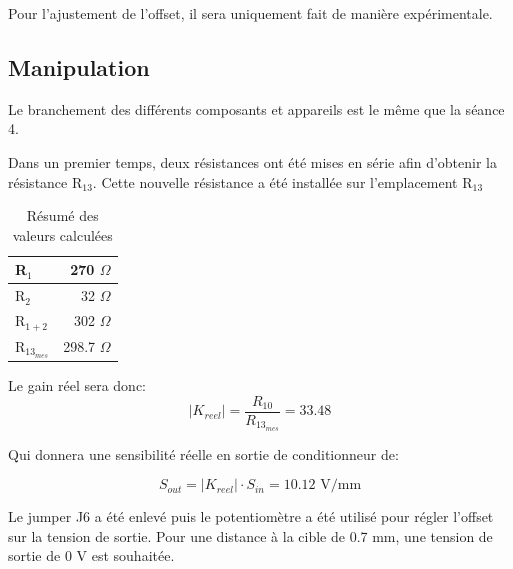 Pour l'ajustement de l'offset, il sera uniquement fait de manière expérimentale.

\subsection{Manipulation}
Le branchement des différents composants et appareils est le même que la séance 4.

\vspace{0.2cm}

Dans un premier temps, deux résistances ont été mises en série afin d'obtenir la résistance
R$_{13}$. Cette nouvelle résistance a été installée sur l'emplacement R$_{13}$

\begin{table}[H]
    \centering
    \begin{tabular}{|l|r|}
    \cline{1-2}
    R$_{1}$   & 270 $\Omega$   \\ \hline
    R$_{2}$   & 32  $\Omega$        \\ \hline
    R$_{1+2}$ & 302 $\Omega$ \\ \hline
    R$_{13_{mes}}$ & 298.7 $\Omega$ \\ \hline
    \end{tabular}
    \caption{Résumé des valeurs calculées}
    \label{tab:ResumeValeurs}
\end{table}

Le gain réel sera donc:
\begin{equation*}
    |K_{reel}| = \frac{R_{10}}{R_{13_{mes}}} = 33.48   
\end{equation*}

Qui donnera une sensibilité réelle en sortie de conditionneur de:

\begin{equation*}
    S_{out} = |K_{reel}|\cdot S_{in} =10.12 \text{ V/mm} 
\end{equation*}
\vspace{0.2cm}

Le jumper J6 a été enlevé puis le potentiomètre a été utilisé pour régler l'offset sur la tension 
de sortie. Pour une distance à la cible de 0.7 mm, une tension de sortie de 0 V est souhaitée.
\vspace{0.2cm}

